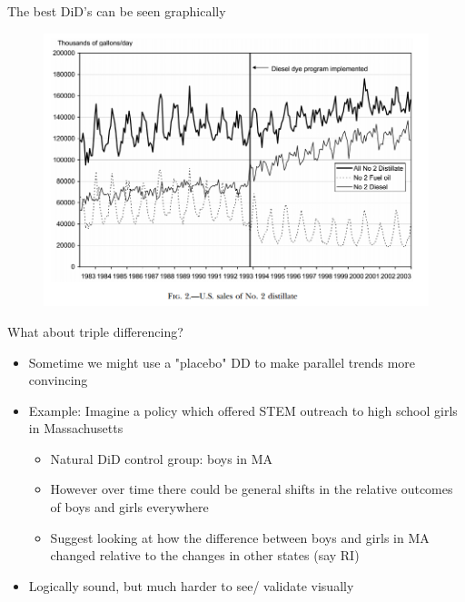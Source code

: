 \begin{frame}{The best DiD's can be seen graphically}
  \begin{figure}
  \centering
  \includegraphics[height=0.8\textheight]{./resources/muehlegger_dying}
  \end{figure}
\end{frame}

\begin{frame}{What about triple differencing?}
  \begin{itemize}
  \item Sometime we might use a "placebo" DD to make parallel trends more convincing
  \item Example: Imagine a policy which offered STEM outreach to high school girls in Massachusetts 
  \begin{itemize}
    \item Natural DiD control group: boys in MA 
    \item However over time there could be general shifts in the relative outcomes of boys and girls everywhere
    \item Suggest looking at how the difference between boys and girls in MA changed relative to the changes in other states (say RI)
  \end{itemize}
  \item Logically sound, but much harder to see/ validate visually
  \end{itemize}
\end{frame}

